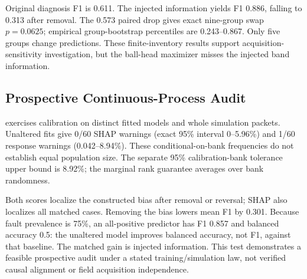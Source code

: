 \documentclass[conference]{IEEEtran}
\begin{document}
\begin{table}[t]
\centering
\caption{CWRU diameter-held-out TreeSHAP audit. B/IR/OR: ball/inner/outer faults. Resonance and removed use the same confounded model, with/without its label-assigned response. Band share sums four broad-band features. These are descriptive scores without a calibrated mechanism-warning threshold.}
\label{tab:cwru-audit}
\footnotesize

\end{table}

Original diagnosis F1 is 0.611. The injected information yields F1 0.886, falling to 0.313 after removal. The 0.573 paired drop gives exact nine-group swap $p=0.0625$; empirical group-bootstrap percentiles are 0.243--0.867. Only five groups change predictions. These finite-inventory results support acquisition-sensitivity investigation, but the ball-head maximizer misses the injected band information.

\subsection{Prospective Continuous-Process Audit}
 exercises calibration on distinct fitted models and whole simulation packets. Unaltered fits give 0/60 SHAP warnings (exact 95\% interval 0--5.96\%) and 1/60 response warnings (0.042--8.94\%). These conditional-on-bank frequencies do not establish equal population size. The separate 95\% calibration-bank tolerance upper bound is 8.92\%; the marginal rank guarantee averages over bank randomness.

Both scores localize the constructed bias after removal or reversal; SHAP also localizes all matched cases. Removing the bias lowers mean F1 by 0.301. Because fault prevalence is 75\%, an all-positive predictor has F1 0.857 and balanced accuracy 0.5: the unaltered model improves balanced accuracy, not F1, against that baseline. The matched gain is injected information. This test demonstrates a feasible prospective audit under a stated training/simulation law, not verified causal alignment or field acquisition independence.

\begin{table}[t]
\centering
\caption{Prospective DTU process audit. W/L gives warning/localization counts out of 60; localization identifies Compressor Work. BA is balanced accuracy. Thresholds are frozen before evaluation, without empirical size matching.}
\label{tab:dtu-prospective}
\footnotesize

\end{table}
\end{document}
